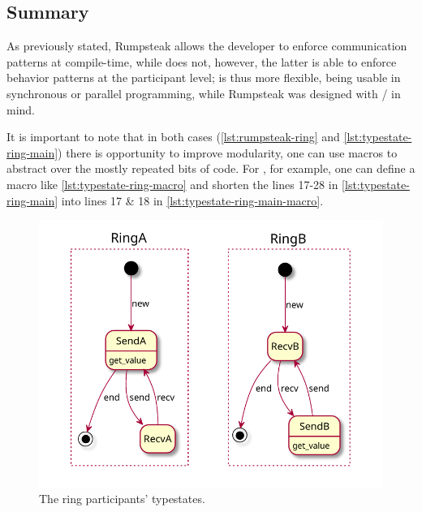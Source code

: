 \subsection{Summary}

As previously stated, Rumpsteak allows the developer to enforce communication patterns at compile-time,
while  does not, however, the latter is able to enforce behavior patterns at the participant level;
 is thus more flexible, being usable in synchronous or parallel programming,
while Rumpsteak was designed with / in mind.

It is important to note that in both cases (\autoref{lst:rumpsteak-ring} and \autoref{lst:typestate-ring-main})
there is opportunity to improve modularity,
one can use macros to abstract over the mostly repeated bits of code.
For , for example, one can define a macro like \autoref{lst:typestate-ring-macro} and
shorten the lines 17-28 in \autoref{lst:typestate-ring-main} into lines 17 \& 18 in \autoref{lst:typestate-ring-main-macro}.


\begin{figure}
    \centering
    \includegraphics[width=0.75\linewidth]{Chapters/Figures/C5/rings.pdf}
    \caption{The ring participants' typestates.}
    \label{fig:ring-typestate}
\end{figure}

